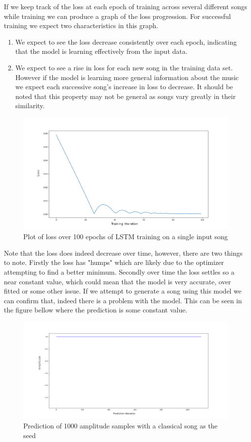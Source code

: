 \documentclass{article}
\begin{document}
If we keep track of the loss at each epoch of training across several different songs while training we can produce a graph of the loss progression. For successful training we expect two characteristics in this graph.
\begin{enumerate}
\item We expect to see the loss decrease consistently over each epoch, indicating that the model is learning effectively from the input data.
\item We expect to see a rise in loss for each new song in the training data set. However if the model is learning more general information about the music we expect each successive song's increase in loss to decrease. It should be noted that this property may not be general as songs vary greatly in their similarity.
\end{enumerate}
\begin{figure}[H]
\caption{Plot of loss over 100 epochs of LSTM training on a single input song}
\includegraphics[scale=0.35]{loss_plot_100itr.png}
\end{figure}
Note that the loss does indeed decrease over time, however, there are two things to note. Firstly the loss has "humps" which are likely due to the optimizer attempting to find a better minimum. Secondly over time the loss settles so a near constant value, which could mean that the model is very accurate, over fitted or some other issue. If we attempt to generate a song using this model we can confirm that, indeed there is a problem with the model. This can be seen in the figure bellow where the prediction is some constant value. 
\begin{figure}[H]
\caption{Prediction of 1000 amplitude samples with a classical song as the seed}
\includegraphics[scale=0.35]{overfit_1.png}
\end{figure}
\end{document}
